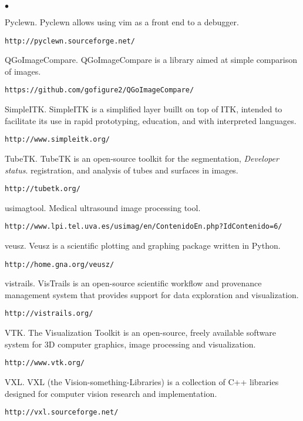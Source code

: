 \documentclass[margin,line]{res}
\newenvironment{list2}{
  \begin{list}{$\bullet$}{%
      \setlength{\itemsep}{0in}
      \setlength{\parsep}{0in} \setlength{\parskip}{0in}
      \setlength{\topsep}{0in} \setlength{\partopsep}{0in} 
      \setlength{\leftmargin}{0.2in}}}{\end{list}}
\begin{document}
\begin{resume}
\begin{list2}
\item Pyclewn.  Pyclewn allows using vim as a front end to a debugger.
  \begin{verbatim}http://pyclewn.sourceforge.net/\end{verbatim}
\item QGoImageCompare.  QGoImageCompare is a library aimed at simple comparison
  of images.
  \begin{verbatim}https://github.com/gofigure2/QGoImageCompare/\end{verbatim}
\item SimpleITK.  SimpleITK is a simplified layer buillt on top of ITK, intended
  to facilitate its use in rapid prototyping, education, and with interpreted
  languages.
  \begin{verbatim}http://www.simpleitk.org/\end{verbatim}
\item TubeTK.  TubeTK is an open-source toolkit for the segmentation, \textit{Developer status}.
  registration, and analysis of tubes and surfaces in images.
  \begin{verbatim}http://tubetk.org/\end{verbatim}
\item usimagtool.  Medical ultrasound image processing tool.
  \begin{verbatim}http://www.lpi.tel.uva.es/usimag/en/ContenidoEn.php?IdContenido=6/\end{verbatim}
\item veusz.  Veusz is a scientific plotting and graphing package written in
  Python.  \begin{verbatim}http://home.gna.org/veusz/\end{verbatim}
\item vistrails.  VisTrails is an open-source scientific workflow and provenance
  management system that provides support for data exploration and visualization.
  \begin{verbatim}http://vistrails.org/\end{verbatim}
\item VTK.  The Visualization Toolkit is an open-source, freely available
  software system for 3D computer graphics, image processing and visualization.
  \begin{verbatim}http://www.vtk.org/\end{verbatim}
\item VXL.  VXL (the Vision-something-Libraries) is a collection of C++
  libraries designed for computer vision research and implementation.
  \begin{verbatim}http://vxl.sourceforge.net/\end{verbatim}
\end{list2}


\end{resume}
\end{document}
